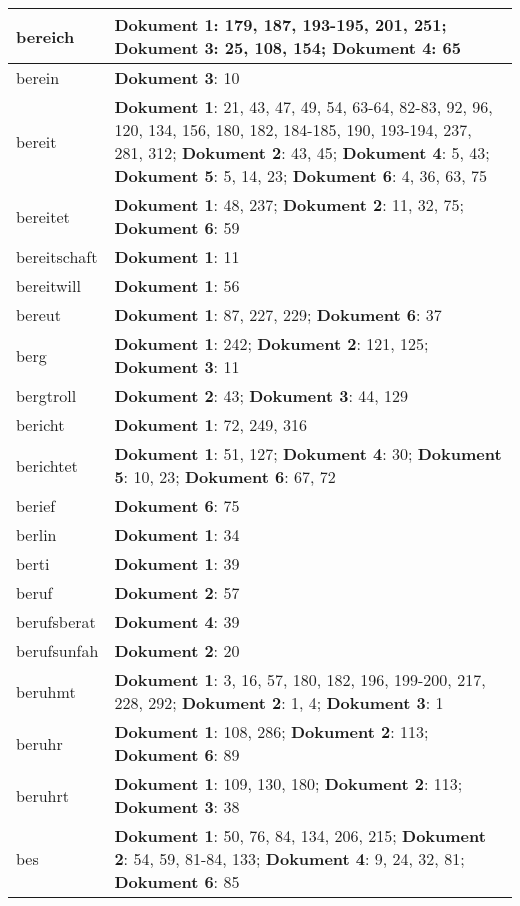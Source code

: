 \documentclass[a5paper]{article}
\begin{document}
\begin{longtable}[l]{|l|p{3in}|}
\hline
bereich & \textbf{Dokument 1}: 179, 187, 193-195, 201, 251; \textbf{Dokument 3}: 25, 108, 154; \textbf{Dokument 4}: 65 \\
\hline
berein & \textbf{Dokument 3}: 10 \\
\hline
bereit & \textbf{Dokument 1}: 21, 43, 47, 49, 54, 63-64, 82-83, 92, 96, 120, 134, 156, 180, 182, 184-185, 190, 193-194, 237, 281, 312; \textbf{Dokument 2}: 43, 45; \textbf{Dokument 4}: 5, 43; \textbf{Dokument 5}: 5, 14, 23; \textbf{Dokument 6}: 4, 36, 63, 75 \\
\hline
bereitet & \textbf{Dokument 1}: 48, 237; \textbf{Dokument 2}: 11, 32, 75; \textbf{Dokument 6}: 59 \\
\hline
bereitschaft & \textbf{Dokument 1}: 11 \\
\hline
bereitwill & \textbf{Dokument 1}: 56 \\
\hline
bereut & \textbf{Dokument 1}: 87, 227, 229; \textbf{Dokument 6}: 37 \\
\hline
berg & \textbf{Dokument 1}: 242; \textbf{Dokument 2}: 121, 125; \textbf{Dokument 3}: 11 \\
\hline
bergtroll & \textbf{Dokument 2}: 43; \textbf{Dokument 3}: 44, 129 \\
\hline
bericht & \textbf{Dokument 1}: 72, 249, 316 \\
\hline
berichtet & \textbf{Dokument 1}: 51, 127; \textbf{Dokument 4}: 30; \textbf{Dokument 5}: 10, 23; \textbf{Dokument 6}: 67, 72 \\
\hline
berief & \textbf{Dokument 6}: 75 \\
\hline
berlin & \textbf{Dokument 1}: 34 \\
\hline
berti & \textbf{Dokument 1}: 39 \\
\hline
beruf & \textbf{Dokument 2}: 57 \\
\hline
berufsberat & \textbf{Dokument 4}: 39 \\
\hline
berufsunfah & \textbf{Dokument 2}: 20 \\
\hline
beruhmt & \textbf{Dokument 1}: 3, 16, 57, 180, 182, 196, 199-200, 217, 228, 292; \textbf{Dokument 2}: 1, 4; \textbf{Dokument 3}: 1 \\
\hline
beruhr & \textbf{Dokument 1}: 108, 286; \textbf{Dokument 2}: 113; \textbf{Dokument 6}: 89 \\
\hline
beruhrt & \textbf{Dokument 1}: 109, 130, 180; \textbf{Dokument 2}: 113; \textbf{Dokument 3}: 38 \\
\hline
bes & \textbf{Dokument 1}: 50, 76, 84, 134, 206, 215; \textbf{Dokument 2}: 54, 59, 81-84, 133; \textbf{Dokument 4}: 9, 24, 32, 81; \textbf{Dokument 6}: 85 \\

\end{longtable}
\end{document}
